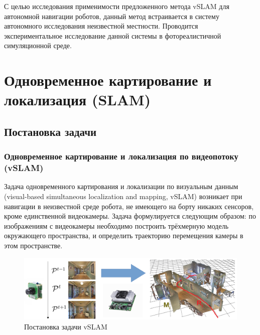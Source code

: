 \documentclass{mipt-thesis-ms}
\begin{document}
	С целью исследования применимости предложенного метода vSLAM для автономной навигации роботов, данный метод встраивается в систему автономного исследования неизвестной местности. Проводится экспериментальное исследование данной системы в фотореалистичной симуляционной среде.
	
	
	\chapter{Одновременное картирование и локализация (SLAM)}
	
	\section{Постановка задачи}
	
	\subsection{Одновременное картирование и локализация по видеопотоку (vSLAM)}
	
	Задача одновременного картирования и локализации по визуальным данным (visual-based simultaneous localization and mapping, vSLAM) возникает при навигации в неизвестной среде робота, не имеющего на борту никаких сенсоров, кроме единственной видеокамеры. Задача формулируется следующим образом: по изображениям с видеокамеры необходимо построить трёхмерную модель окружающего пространства, и определить траекторию перемещения камеры в этом пространстве.
	
	\begin{figure}
		\includegraphics[width=1.0\textwidth]{img/vslam_problem_setting.png}
		\caption{Постановка задачи vSLAM}
		\label{figure_vslam_setting}
	\end{figure}
	
\end{document}

